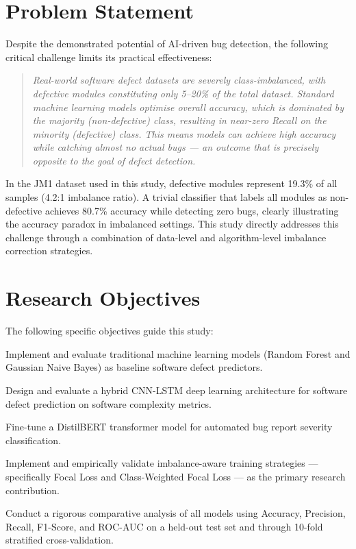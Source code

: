 \documentclass[12pt,a4paper,oneside]{report}
\begin{document}
\section{Problem Statement}

Despite the demonstrated potential of AI-driven bug detection, the following critical challenge limits its practical effectiveness:

\begin{quote}
\textit{Real-world software defect datasets are severely class-imbalanced, with defective modules constituting only 5--20\% of the total dataset. Standard machine learning models optimise overall accuracy, which is dominated by the majority (non-defective) class, resulting in near-zero Recall on the minority (defective) class. This means models can achieve high accuracy while catching almost no actual bugs --- an outcome that is precisely opposite to the goal of defect detection.}
\end{quote}

In the JM1 dataset used in this study, defective modules represent 19.3\% of all samples (4.2:1 imbalance ratio). A trivial classifier that labels all modules as non-defective achieves 80.7\% accuracy while detecting zero bugs, clearly illustrating the accuracy paradox in imbalanced settings. This study directly addresses this challenge through a combination of data-level and algorithm-level imbalance correction strategies.

\section{Research Objectives}

The following specific objectives guide this study:

\begin{description}[leftmargin=2em]
  \item[O1:] Implement and evaluate traditional machine learning models (Random Forest and Gaussian Naive Bayes) as baseline software defect predictors.
  \item[O2:] Design and evaluate a hybrid CNN-LSTM deep learning architecture for software defect prediction on software complexity metrics.
  \item[O3:] Fine-tune a DistilBERT transformer model for automated bug report severity classification.
  \item[O4:] Implement and empirically validate imbalance-aware training strategies --- specifically Focal Loss and Class-Weighted Focal Loss --- as the primary research contribution.
  \item[O5:] Conduct a rigorous comparative analysis of all models using Accuracy, Precision, Recall, F1-Score, and ROC-AUC on a held-out test set and through 10-fold stratified cross-validation.
\end{description}
\end{document}
